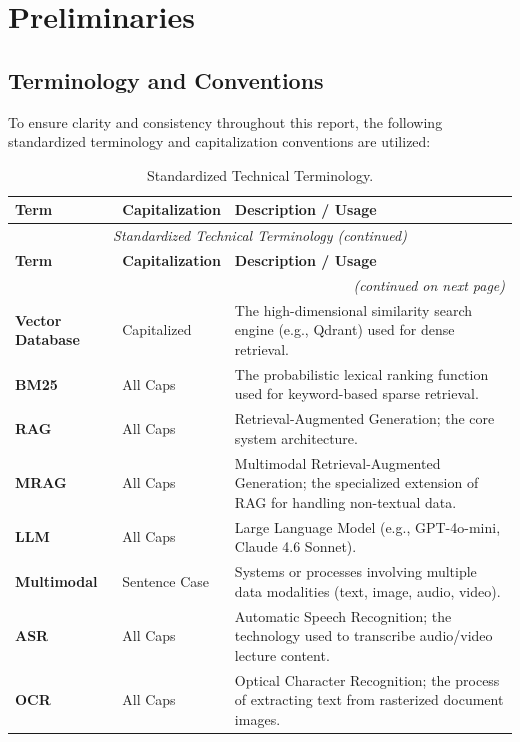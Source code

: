 ﻿\chapter{Preliminaries}

\section{Terminology and Conventions}

To ensure clarity and consistency throughout this report, the following standardized terminology and capitalization conventions are utilized:

\begin{longtable}{llp{8cm}}
\caption{Standardized Technical Terminology.} \label{tab:terminology} \\
\toprule
\textbf{Term} & \textbf{Capitalization} & \textbf{Description / Usage} \\
\midrule
\endfirsthead
\multicolumn{3}{c}{\textit{Standardized Technical Terminology (continued)}} \\
\toprule
\textbf{Term} & \textbf{Capitalization} & \textbf{Description / Usage} \\
\midrule
\endhead
\midrule \multicolumn{3}{r}{\textit{(continued on next page)}} \\
\endfoot
\bottomrule
\endlastfoot
\textbf{Vector Database} & Capitalized & The high-dimensional similarity search engine (e.g., Qdrant) used for dense retrieval. \\
\textbf{BM25} & All Caps & The probabilistic lexical ranking function used for keyword-based sparse retrieval. \\
\textbf{RAG} & All Caps & Retrieval-Augmented Generation; the core system architecture. \\
\textbf{MRAG} & All Caps & Multimodal Retrieval-Augmented Generation; the specialized extension of RAG for handling non-textual data. \\
\textbf{LLM} & All Caps & Large Language Model (e.g., GPT-4o-mini, Claude 4.6 Sonnet). \\
\textbf{Multimodal} & Sentence Case & Systems or processes involving multiple data modalities (text, image, audio, video). \\
\textbf{ASR} & All Caps & Automatic Speech Recognition; the technology used to transcribe audio/video lecture content. \\
\textbf{OCR} & All Caps & Optical Character Recognition; the process of extracting text from rasterized document images. \\

\end{longtable}
